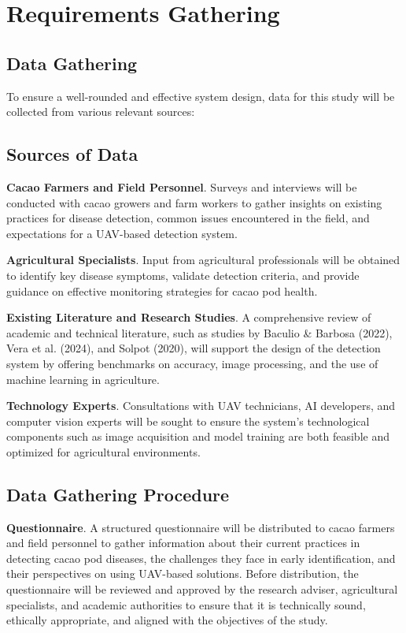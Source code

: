 \section{Requirements Gathering}
\subsection{Data Gathering}

To ensure a well-rounded and effective system design, data for this study will be collected from various relevant sources:
\subsection{Sources of Data}
\textbf{Cacao Farmers and Field Personnel}. Surveys and interviews will be conducted with cacao growers and farm workers to gather insights on existing practices for disease detection, common issues encountered in the field, and expectations for a UAV-based detection system.

\textbf{Agricultural Specialists}. Input from agricultural professionals will be obtained to identify key disease symptoms, validate detection criteria, and provide guidance on effective monitoring strategies for cacao pod health.

\textbf{Existing Literature and Research Studies}. A comprehensive review of academic and technical literature, such as studies by Baculio \& Barbosa (2022), Vera et al. (2024), and Solpot (2020), will support the design of the detection system by offering benchmarks on accuracy, image processing, and the use of machine learning in agriculture.

\textbf{Technology Experts}. Consultations with UAV technicians, AI developers, and computer vision experts will be sought to ensure the system’s technological components such as image acquisition and model training are both feasible and optimized for agricultural environments.

\subsection{Data Gathering Procedure}

\textbf{Questionnaire}. A structured questionnaire will be distributed to cacao farmers and field personnel to gather information about their current practices in detecting cacao pod diseases, the challenges they face in early identification, and their perspectives on using UAV-based solutions. Before distribution, the questionnaire will be reviewed and approved by the research adviser, agricultural specialists, and academic authorities to ensure that it is technically sound, ethically appropriate, and aligned with the objectives of the study.

